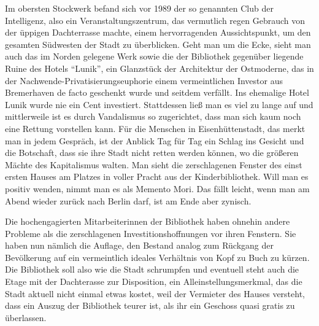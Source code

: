 \documentclass[a4paper,
fontsize=11pt,
oneside,
numbers=noperiodatend,
parskip=half-,
bibliography=totoc,
final
]{scrartcl}
\begin{document}
Im obersten Stockwerk befand sich vor 1989 der so genannten Club der
Intelligenz, also ein Veranstaltungszentrum, das vermutlich regen
Gebrauch von der üppigen Dachterrasse machte, einem hervorragenden
Aussichtspunkt, um den gesamten Südwesten der Stadt zu überblicken. Geht
man um die Ecke, sieht man auch das im Norden gelegene Werk sowie die
der Bibliothek gegenüber liegende Ruine des Hotels \enquote{Lunik}, ein
Glanzstück der Architektur der Ostmoderne, das in der
Nachwende-Privatisierungseuphorie einem vermeintlichen Investor aus
Bremerhaven de facto geschenkt wurde und seitdem verfällt. Ins ehemalige
Hotel Lunik wurde nie ein Cent investiert. Stattdessen ließ man es viel
zu lange auf und mittlerweile ist es durch Vandalismus so zugerichtet,
dass man sich kaum noch eine Rettung vorstellen kann. Für die Menschen
in Eisenhüttenstadt, das merkt man in jedem Gespräch, ist der Anblick
Tag für Tag ein Schlag ins Gesicht und die Botschaft, dass sie ihre
Stadt nicht retten werden können, wo die größeren Mächte des
Kapitalismus walten. Man sieht die zerschlagenen Fenster des einst
ersten Hauses am Platzes in voller Pracht aus der Kinderbibliothek. Will
man es positiv wenden, nimmt man es als Memento Mori. Das fällt leicht,
wenn man am Abend wieder zurück nach Berlin darf, ist am Ende aber
zynisch.

Die hochengagierten Mitarbeiterinnen der Bibliothek haben ohnehin andere
Probleme als die zerschlagenen Investitionshoffnungen vor ihren
Fenstern. Sie haben nun nämlich die Auflage, den Bestand analog zum
Rückgang der Bevölkerung auf ein vermeintlich ideales Verhältnis von
Kopf zu Buch zu kürzen. Die Bibliothek soll also wie die Stadt
schrumpfen und eventuell steht auch die Etage mit der Dachterasse zur
Disposition, ein Alleinstellungsmerkmal, das die Stadt aktuell nicht
einmal etwas kostet, weil der Vermieter des Hauses versteht, dass ein
Auszug der Bibliothek teurer ist, als ihr ein Geschoss quasi gratis zu
überlassen.
\end{document}
